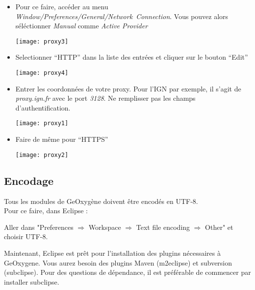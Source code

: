 \begin{itemize}[leftmargin=* ,parsep=0cm,itemsep=0cm,topsep=0cm]

\item Pour ce faire, accéder au menu \emph{Window/Preferences/General/Network~Connection}. Vous pouvez alors séléctionner \emph{Manual} comme \emph{Active Provider} 

\begin{center}
\texttt{[image: proxy3]}
\end{center}

\item Selectionner “HTTP” dans la liste des entrées et cliquer sur le bouton “Edit”

\begin{center}
\texttt{[image: proxy4]}
\end{center}


\item Entrer les coordonnées de votre proxy. Pour l'IGN par exemple, il s'agit de \emph{proxy.ign.fr} avec le port \emph{3128}. Ne remplisser pas les champs d'authentification.

\begin{center}
\texttt{[image: proxy1]}
\end{center}


\item Faire de même pour “HTTPS”

\begin{center}
\texttt{[image: proxy2]}
\end{center}


\end{itemize}


\subsection{Encodage}

Tous les modules de GeOxygène doivent être encodés en UTF-8. \\

\noindent
Pour ce faire, dans Eclipse :

Aller dans "Preferences $\Rightarrow$ Workspace $\Rightarrow$ Text file encoding $\Rightarrow$ Other"  et choisir UTF-8. 

\bigskip
\bigskip



\noindent
Maintenant, Eclipse est prêt pour l'installation des plugins nécessaires à GeOxygene. Vous aurez besoin des plugins Maven (m2eclipse) et subversion (subclipse). Pour des questions de d\'ependance, il est pr\'ef\'erable de commencer par installer subclipse.

